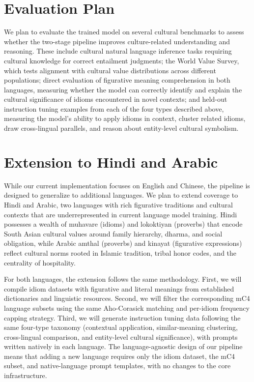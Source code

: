 \documentclass[11pt,a4paper]{article}
\begin{document}
\section{Evaluation Plan}

We plan to evaluate the trained model on several cultural benchmarks to assess whether the two-stage pipeline improves culture-related understanding and reasoning. These include cultural natural language inference tasks requiring cultural knowledge for correct entailment judgments; the World Value Survey, which tests alignment with cultural value distributions across different populations; direct evaluation of figurative meaning comprehension in both languages, measuring whether the model can correctly identify and explain the cultural significance of idioms encountered in novel contexts; and held-out instruction tuning examples from each of the four types described above, measuring the model's ability to apply idioms in context, cluster related idioms, draw cross-lingual parallels, and reason about entity-level cultural symbolism.

\section{Extension to Hindi and Arabic}

While our current implementation focuses on English and Chinese, the pipeline is designed to generalize to additional languages. We plan to extend coverage to Hindi and Arabic, two languages with rich figurative traditions and cultural contexts that are underrepresented in current language model training. Hindi possesses a wealth of muhavare (idioms) and lokoktiyan (proverbs) that encode South Asian cultural values around family hierarchy, dharma, and social obligation, while Arabic amthal (proverbs) and kinayat (figurative expressions) reflect cultural norms rooted in Islamic tradition, tribal honor codes, and the centrality of hospitality.

For both languages, the extension follows the same methodology. First, we will compile idiom datasets with figurative and literal meanings from established dictionaries and linguistic resources. Second, we will filter the corresponding mC4 language subsets using the same Aho-Corasick matching and per-idiom frequency capping strategy. Third, we will generate instruction tuning data following the same four-type taxonomy (contextual application, similar-meaning clustering, cross-lingual comparison, and entity-level cultural significance), with prompts written natively in each language. The language-agnostic design of our pipeline means that adding a new language requires only the idiom dataset, the mC4 subset, and native-language prompt templates, with no changes to the core infrastructure.
\end{document}
